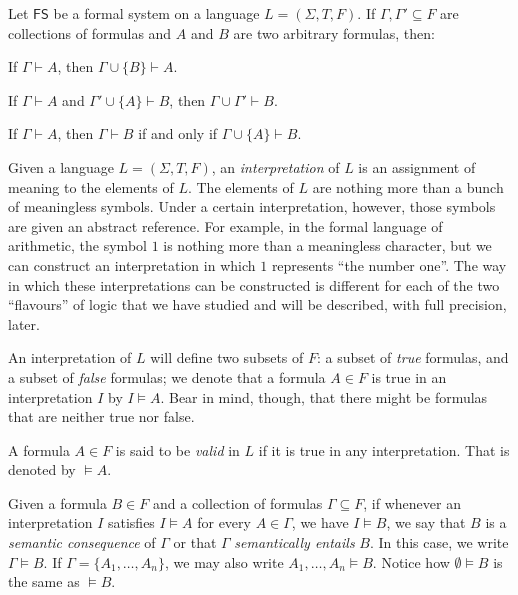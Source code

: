 \begin{proposition}
Let $\mathsf{FS}$ be a formal system on a language $L = (\Sigma, T, F)$. If $\Gamma,\Gamma'\subseteq F$ are collections of formulas and $A$ and $B$ are two arbitrary formulas, then:
\begin{statements}
\item If $\Gamma \vdash A$, then $\Gamma \cup \{B\} \vdash A$.
\item If $\Gamma \vdash A$ and $\Gamma' \cup \{A\} \vdash B$, then $\Gamma \cup \Gamma' \vdash B$.
\item If $\Gamma \vdash A$, then $\Gamma \vdash B$ if and only if $\Gamma \cup \{A\} \vdash B$.
\end{statements}
\label{<+label+>}
\end{proposition}

\begin{definition}
Given a language $L = (\Sigma,T,F)$, an \emph{interpretation} of $L$ is an assignment of meaning to the elements of $L$. The elements of $L$ are nothing more than a bunch of meaningless symbols.
Under a certain interpretation, however, those symbols are given an abstract reference.
For example, in the formal language of arithmetic, the symbol $1$ is nothing more than a meaningless character, but we can construct an interpretation in which $1$ represents ``the number one''.
The way in which these interpretations can be constructed is different for each of the two ``flavours'' of logic that we have studied and will be described, with full precision, later.

An interpretation of $L$ will define two subsets of $F$: a subset of \emph{true} formulas, and a subset of \emph{false} formulas; we denote that a formula $A\in F$ is true in an interpretation $I$ by $I\vDash A$. Bear in mind, though, that there might be formulas that are neither true nor false.

A formula $A\in F$ is said to be \emph{valid} in $L$ if it is true in any interpretation. That is denoted by $\vDash A$.

Given a formula $B\in F$ and a collection of formulas $\Gamma\subseteq F$, if whenever an interpretation $I$ satisfies $I\vDash A$ for every $A\in \Gamma$, we have $I\vDash B$, we say that $B$ is a \emph{semantic consequence} of $\Gamma$ or that $\Gamma$ \emph{semantically entails} $B$.
In this case, we write $\Gamma\vDash B$.
If $\Gamma = \{A_1,\ldots,A_n\}$, we may also write $A_1,\ldots,A_n\vDash B$.
Notice how $\emptyset \vDash B$ is the same as $\vDash B$.
\end{definition}


